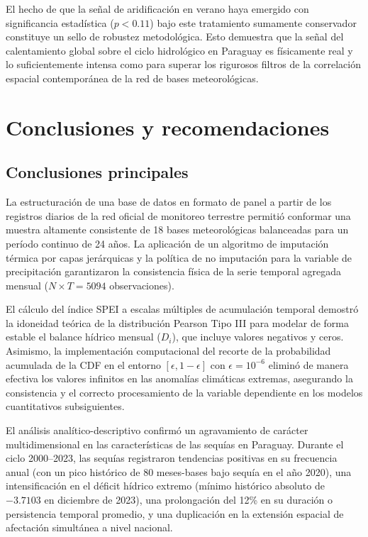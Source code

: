 \documentclass[11pt,a4paper]{article}
\begin{document}
El hecho de que la señal de aridificación en verano haya emergido con significancia estadística ($p < 0.11$) bajo este tratamiento sumamente conservador constituye un sello de robustez metodológica. Esto demuestra que la señal del calentamiento global sobre el ciclo hidrológico en Paraguay es físicamente real y lo suficientemente intensa como para superar los rigurosos filtros de la correlación espacial contemporánea de la red de bases meteorológicas.
\section{Conclusiones y recomendaciones}

\subsection{Conclusiones principales}

La estructuración de una base de datos en formato de panel a partir de los registros diarios de la red oficial de monitoreo terrestre permitió conformar una muestra altamente consistente de 18 bases meteorológicas balanceadas para un período continuo de 24 años. La aplicación de un algoritmo de imputación térmica por capas jerárquicas y la política de no imputación para la variable de precipitación garantizaron la consistencia física de la serie temporal agregada mensual ($N \times T = 5094$ observaciones).

El cálculo del índice SPEI a escalas múltiples de acumulación temporal demostró la idoneidad teórica de la distribución Pearson Tipo III para modelar de forma estable el balance hídrico mensual ($D_i$), que incluye valores negativos y ceros. Asimismo, la implementación computacional del recorte de la probabilidad acumulada de la CDF en el entorno $[\epsilon, 1-\epsilon]$ con $\epsilon = 10^{-6}$ eliminó de manera efectiva los valores infinitos en las anomalías climáticas extremas, asegurando la consistencia y el correcto procesamiento de la variable dependiente en los modelos cuantitativos subsiguientes.

El análisis analítico-descriptivo confirmó un agravamiento de carácter multidimensional en las características de las sequías en Paraguay. Durante el ciclo 2000--2023, las sequías registraron tendencias positivas en su frecuencia anual (con un pico histórico de 80 meses-bases bajo sequía en el año 2020), una intensificación en el déficit hídrico extremo (mínimo histórico absoluto de $-3.7103$ en diciembre de 2023), una prolongación del 12\% en su duración o persistencia temporal promedio, y una duplicación en la extensión espacial de afectación simultánea a nivel nacional.
\end{document}

